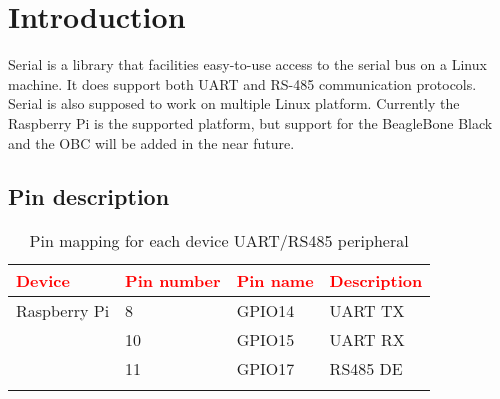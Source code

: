 \chapter{Introduction}


Serial is a library that facilities easy-to-use access to the serial bus on a Linux machine.
It does support both UART and RS-485 communication protocols.
Serial is also supposed to work on multiple Linux platform. Currently the Raspberry Pi is the supported platform, but support for the BeagleBone Black and the OBC will be added in the near future.



\section{Pin description}


\begin{longtable}{| p{} | p{} | p{} | p{} |}
    \hline
    \textcolor{red}{Device} & \textcolor{red}{Pin number} & \textcolor{red}{Pin name} & \textcolor{red}{Description}\\
    \hline
    Raspberry Pi & 8 & GPIO14 & UART TX \\
    \hline
    & 10 & GPIO15 & UART RX  \\
    \hline
    & 11 & GPIO17& RS485 DE \\
    \hline

    \caption{Pin mapping for each device UART/RS485 peripheral}
    \label{tab:pinlegend}
\end{longtable}


